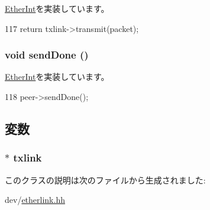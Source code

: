 \hyperlink{classEtherInt_af3076ea966a2abda7735ea65e8a02034}{EtherInt}を実装しています。


\begin{DoxyCode}
117 { return txlink->transmit(packet); }
\end{DoxyCode}
\hypertarget{classEtherLink_1_1Interface_aa1f5a3f61e2513049769a9ca8b16ea2d}{
\subsubsection[{sendDone}]{\setlength{\rightskip}{0pt plus 5cm}void sendDone ()}}
\label{classEtherLink_1_1Interface_aa1f5a3f61e2513049769a9ca8b16ea2d}


\hyperlink{classEtherInt_a5a2f0c04ee61250a128bc992d2118390}{EtherInt}を実装しています。


\begin{DoxyCode}
118 { peer->sendDone(); }
\end{DoxyCode}


\subsection{変数}
\hypertarget{classEtherLink_1_1Interface_aeae29843b3b3a523bfc7a2d85563d63b}{
\subsubsection[{txlink}]{$\ast$ {\bf txlink}}}
\label{classEtherLink_1_1Interface_aeae29843b3b3a523bfc7a2d85563d63b}


このクラスの説明は次のファイルから生成されました:\begin{DoxyCompactItemize}
\item 
dev/\hyperlink{etherlink_8hh}{etherlink.hh}\end{DoxyCompactItemize}
